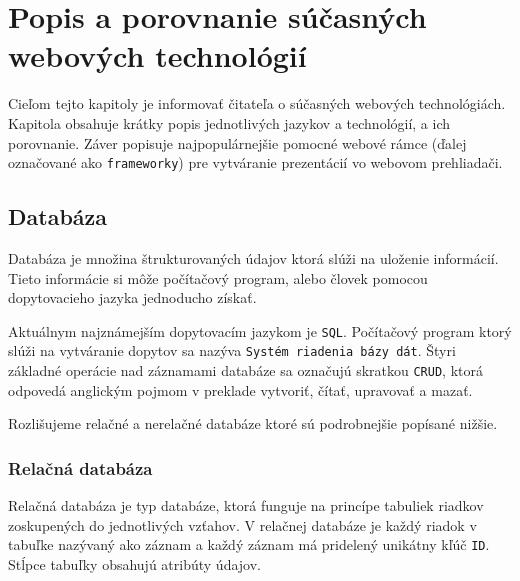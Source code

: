 \chapter{Popis a porovnanie súčasných webových technológií}
Cieľom tejto kapitoly je informovať čitateľa o súčasných webových technológiách. Kapitola obsahuje krátky popis jednotlivých jazykov a technológií, a ich porovnanie. Záver popisuje najpopulárnejšie pomocné webové rámce (ďalej označované ako \texttt{frameworky}) pre vytváranie prezentácií vo webovom prehliadači.

\section{Databáza}
Databáza\cite{database} je množina štrukturovaných údajov ktorá slúži na uloženie informácií. Tieto informácie si môže počítačový program, alebo človek pomocou dopytovacieho jazyka jednoducho získať. 

Aktuálnym najznámejším dopytovacím jazykom je \texttt{SQL}. Počítačový program ktorý slúži na vytváranie dopytov sa nazýva \texttt{Systém riadenia bázy dát}. Štyri základné operácie nad záznamami databáze sa označujú skratkou \texttt{CRUD}, ktorá odpovedá anglickým pojmom v preklade vytvoriť, čítať, upravovať a mazať. 

Rozlišujeme relačné a nerelačné databáze ktoré sú podrobnejšie popísané nižšie.

\subsection{Relačná databáza}
Relačná databáza je typ databáze, ktorá funguje na princípe tabuliek riadkov zoskupených do jednotlivých vzťahov. V relačnej databáze je každý riadok v tabuľke nazývaný ako záznam a každý záznam má pridelený unikátny kľúč \texttt{ID}. Stĺpce tabuľky obsahujú atribúty údajov.

